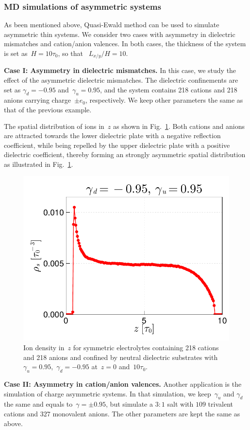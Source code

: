 \subsubsection{MD simulations of asymmetric systems}
As been mentioned above, Quasi-Ewald method can be used to simulate asymmetric thin systems.
We consider two cases with asymmetry in dielectric mismatches and cation/anion valences.
In both cases, the thickness of the system is set as~$H = 10 \tau_0$, so that ~$L_{x/y} / H = 10$.

\textbf{Case I: Asymmetry in dielectric mismatches.}
In this case, we study the effect of the asymmetric dielectric mismatches.
The dielectric confinements are set as $\gamma_d = -0.95$ and~$\gamma_u = 0.95$, and the system contains 218 cations and 218 anions carrying charge~$\pm e_0$, respectively.
We keep other parameters the same as that of the previous example.

The spatial distribution of ions in~$z$ as shown in Fig.~\ref{fig:non_sym}.
Both cations and anions are attracted towards the lower dielectric plate with a negative reflection coefficient, while being repelled by the upper dielectric plate with a positive dielectric coefficient, thereby forming an strongly asymmetric spatial distribution as illustrated in Fig.~\ref{fig:non_sym}.

\begin{figure}[htb]
    \centering
    \includegraphics[width = 0.625\linewidth]{figs/non_symm.pdf}
    \caption{
        Ion density in~$z$ for symmetric electrolytes containing 218 cations and 218 anions and confined by neutral dielectric substrates with $\gamma_u = 0.95$,~$\gamma_d = -0.95$ at~$z = 0$ and~$10\tau_0$.
    }
    \label{fig:non_sym}
\end{figure}

\textbf{Case II: Asymmetry in cation/anion valences.}
Another application is the simulation of charge asymmetric systems.
In that simulation, we keep~$\gamma_u$ and $\gamma_d$ the same and equals to~$\gamma = \pm 0.95$, but simulate a $3:1$ salt with $109$ trivalent cations and $327$ monovalent anions. 
The other parameters are kept the same as above.

